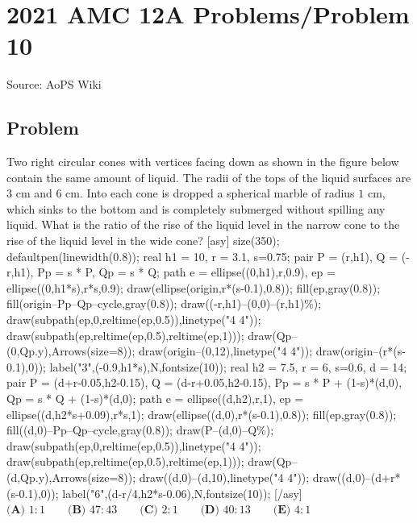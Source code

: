 \documentclass[12pt]{article}
\begin{document}
\section*{{2021 AMC 12A Problems/Problem 10}}
Source: AoPS Wiki

\subsection*{Problem}
Two right circular cones with vertices facing down as shown in the figure below contain the same amount of liquid. The radii of the tops of the liquid surfaces are $3$ cm and $6$ cm. Into each cone is dropped a spherical marble of radius $1$ cm, which sinks to the bottom and is completely submerged without spilling any liquid. What is the ratio of the rise of the liquid level in the narrow cone to the rise of the liquid level in the wide cone? [asy] size(350); defaultpen(linewidth(0.8)); real h1 = 10, r = 3.1, s=0.75; pair P = (r,h1), Q = (-r,h1), Pp = s * P, Qp = s * Q; path e = ellipse((0,h1),r,0.9), ep = ellipse((0,h1*s),r*s,0.9); draw(ellipse(origin,r*(s-0.1),0.8)); fill(ep,gray(0.8)); fill(origin--Pp--Qp--cycle,gray(0.8)); draw((-r,h1)--(0,0)--(r,h1)^^e); draw(subpath(ep,0,reltime(ep,0.5)),linetype("4 4")); draw(subpath(ep,reltime(ep,0.5),reltime(ep,1))); draw(Qp--(0,Qp.y),Arrows(size=8)); draw(origin--(0,12),linetype("4 4")); draw(origin--(r*(s-0.1),0)); label("$3$",(-0.9,h1*s),N,fontsize(10)); real h2 = 7.5, r = 6, s=0.6, d = 14; pair P = (d+r-0.05,h2-0.15), Q = (d-r+0.05,h2-0.15), Pp = s * P + (1-s)*(d,0), Qp = s * Q + (1-s)*(d,0); path e = ellipse((d,h2),r,1), ep = ellipse((d,h2*s+0.09),r*s,1); draw(ellipse((d,0),r*(s-0.1),0.8)); fill(ep,gray(0.8)); fill((d,0)--Pp--Qp--cycle,gray(0.8)); draw(P--(d,0)--Q^^e); draw(subpath(ep,0,reltime(ep,0.5)),linetype("4 4")); draw(subpath(ep,reltime(ep,0.5),reltime(ep,1))); draw(Qp--(d,Qp.y),Arrows(size=8)); draw((d,0)--(d,10),linetype("4 4")); draw((d,0)--(d+r*(s-0.1),0)); label("$6$",(d-r/4,h2*s-0.06),N,fontsize(10)); [/asy] $\textbf{(A) }1:1 \qquad \textbf{(B) }47:43 \qquad \textbf{(C) }2:1 \qquad \textbf{(D) }40:13 \qquad \textbf{(E) }4:1$
\end{document}
